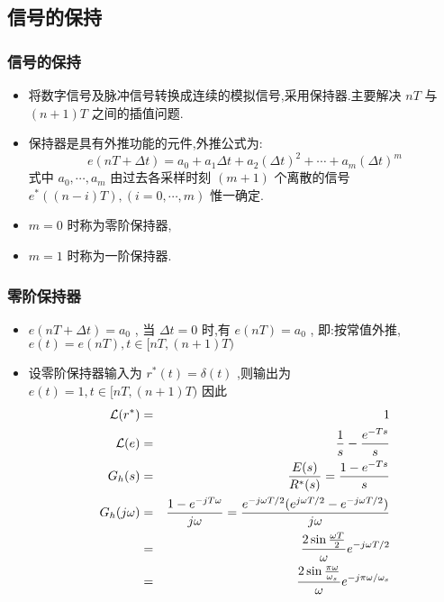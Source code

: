 \documentclass[table]{beamer}
\begin{document}
\subsection{信号的保持}
\label{sec-2-3}
\begin{frame}
\frametitle{信号的保持}
\label{sec-2-3-1}

\begin{itemize}
\item <2->将数字信号及脉冲信号转换成连续的模拟信号,采用保持器.主要解决  $nT$  与  $(n+1)T$  之间的插值问题.
\item <3->保持器是具有外推功能的元件,外推公式为:  
	  \[e(nT+\Delta t)=a_0+a_1 \Delta t+a_2(\Delta t)^2+\cdots+a_m(\Delta t)^m\]
    式中  $a_0,\cdots,a_m$  由过去各采样时刻  $(m+1)$ 个离散的信号  $e^*((n-i)T),(i=0,\cdots,m)$  惟一确定.
\item <4-> $m=0$ 时称为零阶保持器,
\item <5-> $m=1$ 时称为一阶保持器.
\end{itemize}
\end{frame}
\begin{frame}
\frametitle{零阶保持器}
\label{sec-2-3-2}

\begin{itemize}
\item <2-> $e(nT+\Delta t)=a_0$  , 当  $\Delta t=0$  时,有  $e(nT)=a_0$ , 即:按常值外推,  $e(t)=e(nT),t\in [ nT,(n+1)T)$
\item <3-> 设零阶保持器输入为  $r^*(t)=\delta(t)$  ,则输出为  $e(t)=1,t\in [ nT,(n+1)T)$  因此
      \begin{eqnarray*}
      {\cal L} (r^*) &=& 1 \\
      {\cal L} (e) &=& \frac{1}{s}-\frac{e^{-Ts}}{s} \\
      G_h(s) &=& \frac{E(s)}{R^*(s)}
	     = \frac{1-e^{-Ts}}{s} \\
      G_h(j\omega) &= &\frac{1-e^{-jT\omega}}{j\omega} 
       = \frac{e^{-j\omega T/2}(e^{j\omega T/2}-e^{-j\omega T/2})}{j\omega}\\
       &=& \frac{2\sin\frac{\omega T}{2}}{\omega}e^{-j\omega T/2} \\
       &=& \frac{2\sin\frac{\pi\omega}{\omega_s}}{\omega}e^{-j\pi\omega /\omega_s} 
      \end{eqnarray*}
\end{itemize}
\end{frame}
\end{document}

